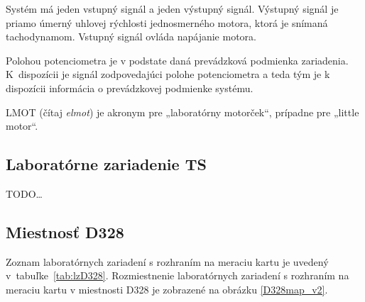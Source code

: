 \documentclass[a4paper, 10pt, ]{article}
\begin{document}
Systém má jeden vstupný signál a jeden výstupný signál. Výstupný signál je priamo úmerný uhlovej rýchlosti jednosmerného motora, ktorá je snímaná tachodynamom. Vstupný signál ovláda napájanie motora.

Polohou potenciometra je v podstate daná prevádzková podmienka zariadenia. K~dispozícii je signál zodpovedajúci polohe potenciometra a teda tým je k dispozícii informácia o prevádzkovej podmienke systému.

LMOT (čítaj \emph{elmot}) je akronym pre „laboratórny motorček“, prípadne pre „little motor“.




\subsection{Laboratórne zariadenie TS}

TODO\ldots






\subsection{Miestnosť D328}

Zoznam laboratórnych zariadení s rozhraním na meraciu kartu je uvedený v~tabuľke~\ref{tab:lzD328}. Rozmiestnenie laboratórnych zariadení s rozhraním na meraciu kartu v miestnosti D328 je zobrazené na obrázku \ref{D328map_v2}.



\begin{center}

    \makebox[\textwidth][c]{%
    
    }

    \label{D328map_v2}

\end{center}
\end{document}
